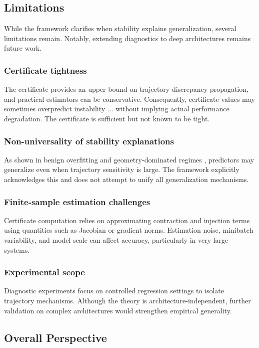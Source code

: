 \documentclass{article}
\numberwithin{equation}{section}
\begin{document}
\subsection{Limitations}
\label{subsec:discussion_limitations}

While the framework clarifies when stability explains generalization, several limitations remain. Notably, extending diagnostics to deep architectures remains future work.

\subsubsection{Certificate tightness}
The certificate provides an upper bound on trajectory discrepancy propagation, and practical estimators can be conservative. Consequently, certificate values may sometimes overpredict instability ... without implying actual performance degradation. The certificate is sufficient but not known to be tight.

\subsubsection{Non-universality of stability explanations}
As shown in benign overfitting and geometry-dominated regimes \cite{BartlettLongLugosiTsigler2020}, predictors may generalize even when trajectory sensitivity is large. The framework explicitly acknowledges this and does not attempt to unify all generalization mechanisms.

\subsubsection{Finite-sample estimation challenges}
Certificate computation relies on approximating contraction and injection terms using quantities such as Jacobian or gradient norms. Estimation noise, minibatch variability, and model scale can affect accuracy, particularly in very large systems.

\subsubsection{Experimental scope}
Diagnostic experiments focus on controlled regression settings to isolate trajectory mechanisms. Although the theory is architecture-independent, further validation on complex architectures would strengthen empirical generality.

\subsection{Overall Perspective}
\end{document}
